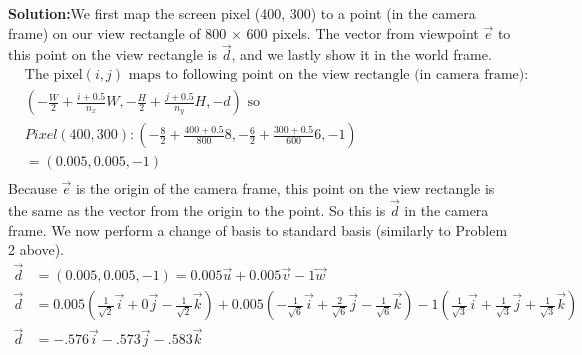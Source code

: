 \documentclass[a4paper, 12pt]{article}
\begin{document}
\begin{enumerate}
        \textbf{Solution:}We first map the screen pixel (400, 300) to a point (in the camera frame) on our view rectangle of 800 $\times$ 600 pixels. The vector from viewpoint $\vec{e}$ to this point on the view rectangle is $\vec{d}$, and we lastly show it in the world frame.
    \begin{align*}
        &\text{The pixel$(i, j)$ maps to following point on the view rectangle (in camera frame):}\\
        &\left( -\frac{W}{2} + \frac{i + 0.5}{n_x}W, -\frac{H}{2} + \frac{j + 0.5}{n_y}H, -d \right) \text{ so}\\
        &Pixel(400, 300) : \left( -\frac{8}{2} + \frac{400 + 0.5}{800}8, -\frac{6}{2} + \frac{300 + 0.5}{600}6, -1 \right)\\
        &= (0.005, 0.005, -1)\\
    \end{align*}
        Because $\vec{e}$ is the origin of the camera frame, this point on the view rectangle is the same as the vector from the origin to the point. So this is $\vec{d}$ in the camera frame. We now perform a change of basis to standard basis (similarly to Problem 2 above).
        \begin{align*}
            \vec{d} &= (0.005, 0.005, -1) = 0.005\vec{u} + 0.005\vec{v} - 1\vec{w}\\
            \vec{d} &= 0.005\left( \frac{1}{\sqrt{2}}\vec{i} + 0\vec{j} -\frac{1}{\sqrt{2}}\vec{k} \right) + 0.005\left(-\frac{1}{\sqrt{6}}\vec{i} + \frac{2}{\sqrt{6}}\vec{j} -\frac{1}{\sqrt{6}}\vec{k} \right) - 1\left( \frac{1}{\sqrt{3}}\vec{i} + \frac{1}{\sqrt{3}}\vec{j} + \frac{1}{\sqrt{3}}\vec{k} \right)\\
            \vec{d} &= -.576\vec{i} - .573\vec{j} -.583\vec{k}\\
    \end{align*}


\end{enumerate}
\end{document}

